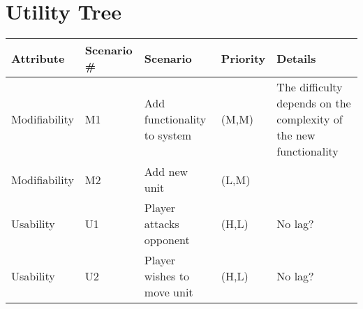 \section{Utility Tree}
\begin{tabular}{|l|l|l|l|l|}
  \hline
  {\bf Attribute} & {\bf Scenario \#} & {\bf Scenario} & {\bf Priority} &
    {\bf Details} \\ \hline
  Modifiability & M1 & Add functionality to system & (M,M) & The difficulty depends on the complexity of the new functionality \\ \hline
  Modifiability & M2 & Add new unit & (L,M) & \\ \hline
  Usability & U1 & Player attacks opponent & (H,L) & No lag?\\ \hline
  Usability & U2 & Player wishes to move unit & (H,L) & No lag?\\ \hline
\end{tabular}
